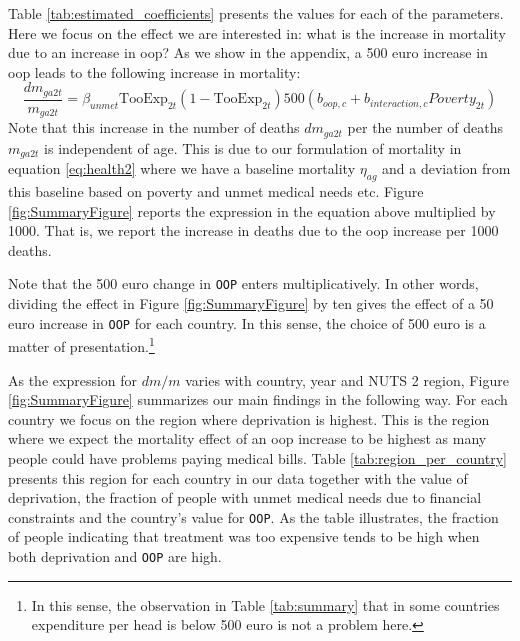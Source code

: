 \documentclass[a4paper,12pt]{article}
\begin{document}
Table \ref{tab:estimated_coefficients} presents the values for each of the parameters. Here we focus on the effect we are interested in: what is the increase in mortality due to an increase in oop? As we show in the appendix, a 500 euro increase in oop leads to the following increase in mortality:
\begin{equation}
\label{eq:change_mortality}
\frac{dm_{ga2t}}{m_{ga2t}} = \beta_{unmet} \text{TooExp}_{2t}(1-\text{TooExp}_{2t}) 500 (b_{oop,c}+b_{interaction,c} Poverty_{2t})
\end{equation}
Note that this increase in the number of deaths \(dm_{ga2t}\) per the number of deaths \(m_{ga2t}\) is independent of age. This is due to our formulation of mortality in equation \eqref{eq:health2} where we have a baseline mortality \(\eta_{ag}\) and a deviation from this baseline based on poverty and unmet medical needs etc. Figure \ref{fig:SummaryFigure} reports the expression in the equation above multiplied by 1000. That is, we report the increase in deaths due to the oop increase per 1000 deaths.

Note that the 500 euro change in \texttt{OOP} enters multiplicatively. In other words, dividing the effect in Figure \ref{fig:SummaryFigure} by ten gives the effect of a 50 euro increase in \texttt{OOP} for each country. In this sense, the choice of 500 euro is a matter of presentation.\footnote{In this sense, the observation in Table \ref{tab:summary} that in some countries expenditure per head is below 500 euro is not a problem here.}

As the expression for \(dm/m\) varies with country, year and NUTS 2 region, Figure \ref{fig:SummaryFigure} summarizes our main findings in the following way. For each country we focus on the region where deprivation is highest. This is the region where we expect the mortality effect of an oop increase to be highest as many people could have problems paying medical bills. Table \ref{tab:region_per_country} presents this region for each country in our data together with the value of deprivation, the fraction of people with unmet medical needs due to financial constraints and the country's value for \texttt{OOP}. As the table illustrates, the fraction of people indicating that treatment was too expensive tends to be high when both deprivation and \texttt{OOP} are high.
\end{document}

